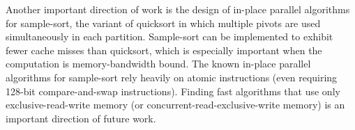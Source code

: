 \documentclass[sigplan, 10pt, nonacm]{acmart}
\renewcommand{\paragraph}[1]{\vspace{0.09in}\noindent{\bf \boldmath #1.}}
\theoremstyle{remark}
\theoremstyle{remark}
\begin{document}
Another important direction of work is the design of in-place parallel
algorithms for sample-sort, the variant of quicksort in which multiple
pivots are used simultaneously in each partition. Sample-sort can be
implemented to exhibit fewer cache misses than quicksort, which is
especially important when the computation is memory-bandwidth
bound. The known in-place parallel algorithms for sample-sort rely
heavily on atomic instructions \cite{AxtmannWi17} (even requiring
128-bit compare-and-swap instructions). Finding fast algorithms that
use only exclusive-read-write memory (or
concurrent-read-exclusive-write memory) is an important direction of
future work.



\end{document}
